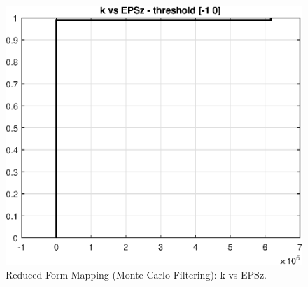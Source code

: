 
\begin{figure}[H]
\centering 
\includegraphics[width=1.00\textwidth]{RBC_kz/gsa/redform_prior/k_vs_EPSz_threshold/RBC_kz_prior_k_vs_EPSz}
\caption{Reduced Form Mapping (Monte Carlo Filtering): k vs EPSz.}\label{Fig:prior_k_vs_EPSz}
\end{figure}

